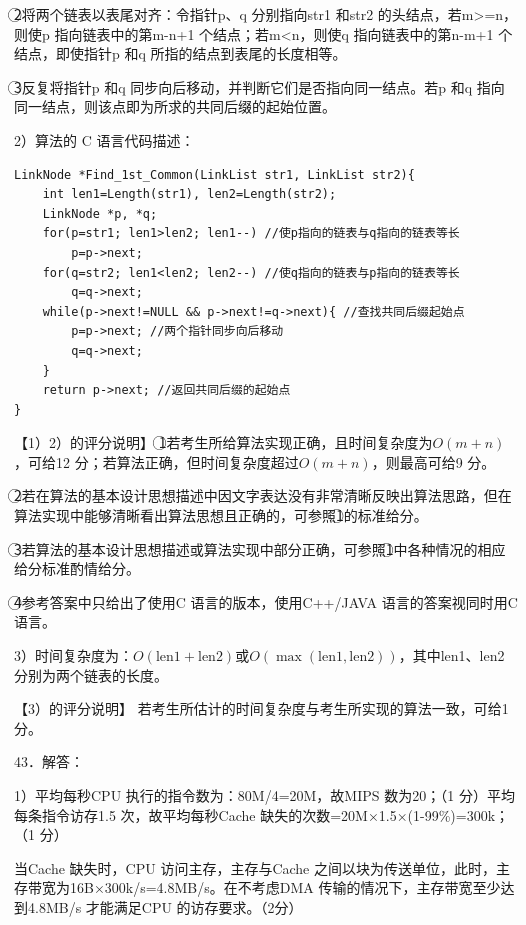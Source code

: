 \documentclass[UTF8,11pt]{ctexart}
\begin{document}
\textcircled{2}将两个链表以表尾对齐：令指针p、q 分别指向str1 和str2 的头结点，若m>=n，则使p 指向链表中的第m-n+1 个结点；若m<n，则使q 指向链表中的第n-m+1 个结点，即使指针p 和q 所指的结点到表尾的长度相等。


\textcircled{3}反复将指针p 和q 同步向后移动，并判断它们是否指向同一结点。若p 和q 指向同一结点，则该点即为所求的共同后缀的起始位置。


2）算法的 C 语言代码描述：


\begin{Verbatim}[breaklines,breakanywhere,fontsize=\small]
LinkNode *Find_1st_Common(LinkList str1, LinkList str2){
    int len1=Length(str1), len2=Length(str2);
    LinkNode *p, *q;
    for(p=str1; len1>len2; len1--) //使p指向的链表与q指向的链表等长
        p=p->next;
    for(q=str2; len1<len2; len2--) //使q指向的链表与p指向的链表等长
        q=q->next;
    while(p->next!=NULL && p->next!=q->next){ //查找共同后缀起始点
        p=p->next; //两个指针同步向后移动
        q=q->next;
    }
    return p->next; //返回共同后缀的起始点
}
\end{Verbatim}

【1）2）的评分说明】 \textcircled{1}若考生所给算法实现正确，且时间复杂度为\(\displaystyle O(m+n)\)，可给12 分；若算法正确，但时间复杂度超过\(\displaystyle O(m+n)\)，则最高可给9 分。


\textcircled{2}若在算法的基本设计思想描述中因文字表达没有非常清晰反映出算法思路，但在算法实现中能够清晰看出算法思想且正确的，可参照\textcircled{1}的标准给分。


\textcircled{3}若算法的基本设计思想描述或算法实现中部分正确，可参照\textcircled{1}中各种情况的相应给分标准酌情给分。


\textcircled{4}参考答案中只给出了使用C 语言的版本，使用C++/JAVA 语言的答案视同时用C 语言。


3）时间复杂度为：\(\displaystyle O(\mathrm{len1}+\mathrm{len2})\)或\(\displaystyle O(\displaystyle \max(\mathrm{len1},\allowbreak \mathrm{len2}))\)，其中len1、len2 分别为两个链表的长度。


【3）的评分说明】 若考生所估计的时间复杂度与考生所实现的算法一致，可给1 分。


43．解答：


1）平均每秒CPU 执行的指令数为：80M/4=20M，故MIPS 数为20；（1 分）平均每条指令访存1.5 次，故平均每秒Cache 缺失的次数=20M×1.5×(1-99\%)=300k；（1 分）


当Cache 缺失时，CPU 访问主存，主存与Cache 之间以块为传送单位，此时，主存带宽为16B×300k/s=4.8MB/s。在不考虑DMA 传输的情况下，主存带宽至少达到4.8MB/s 才能满足CPU 的访存要求。（2分）
\end{document}
